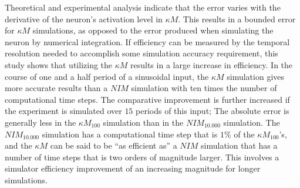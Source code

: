 	Theoretical and experimental analysis indicate that the error varies with the derivative of the neuron's activation level in $\kappa M$. %
	This results in a bounded error for $\kappa M$ simulations, as opposed to the error produced when simulating the neuron by numerical integration.
	If efficiency can be measured by the temporal resolution needed to accomplish some simulation accuracy requirement, this study shows that utilizing the $\kappa M$ results in a large increase in efficiency.
	In the course of one and a half period of a sinusoidal input, the $\kappa M$ simulation gives more accurate results than a $NIM$ 
		simulation with ten times the number of computational time steps.
	The comparative improvement is further increased if the experiment is simulated over $15$ periods of this input;
		The absolute error is generally less in the $\kappa M_{100}$ simulation than in the $NIM_{10.000}$ simulation. %
	The $NIM_{10.000}$ simulation has a computational time step that is $1\%$ of the $\kappa M_{100}$'s, and the $\kappa M$ can be said to be ``as efficient as'' a $NIM$ simulation that has a number of time steps that is two orders of magnitude larger.
	This involves a simulator efficiency improvement of an increasing magnitude for longer simulations.
